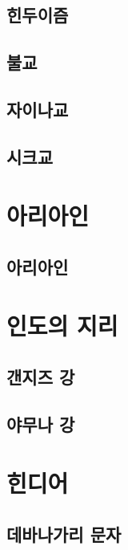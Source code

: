 \documentclass[12pt, a4paper, oneside]{book}
\let\stdsection\section
\renewcommand\section{\newpage\stdsection}
\begin{document}
\section{힌두이즘}

\section{불교}

\section{자이나교}


\section{시크교}


\chapter{아리아인}

\section{아리아인}



\chapter{인도의 지리}


\newpage
\section{갠지즈 강}

\section{야무나 강}



	\chapter{힌디어}


	\section{데바나가리 문자}
\end{document}
